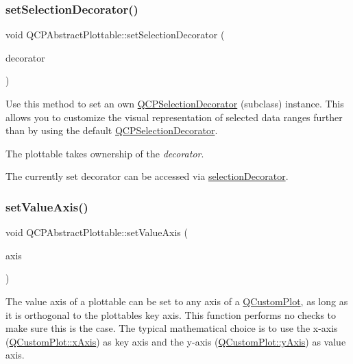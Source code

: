 \subsubsection{\texorpdfstring{set\+Selection\+Decorator()}{setSelectionDecorator()}}
{\footnotesize\ttfamily void Q\+C\+P\+Abstract\+Plottable\+::set\+Selection\+Decorator (\begin{DoxyParamCaption}\item[{\hyperlink{class_q_c_p_selection_decorator}{Q\+C\+P\+Selection\+Decorator} $\ast$}]{decorator }\end{DoxyParamCaption})}

Use this method to set an own \hyperlink{class_q_c_p_selection_decorator}{Q\+C\+P\+Selection\+Decorator} (subclass) instance. This allows you to customize the visual representation of selected data ranges further than by using the default \hyperlink{class_q_c_p_selection_decorator}{Q\+C\+P\+Selection\+Decorator}.

The plottable takes ownership of the {\itshape decorator}.

The currently set decorator can be accessed via \hyperlink{class_q_c_p_abstract_plottable_a7861518e47ca0c6a0c386032c2db075e}{selection\+Decorator}. \mbox{\label{class_q_c_p_abstract_plottable_a71626a07367e241ec62ad2c34baf21cb}} 
\subsubsection{\texorpdfstring{set\+Value\+Axis()}{setValueAxis()}}
{\footnotesize\ttfamily void Q\+C\+P\+Abstract\+Plottable\+::set\+Value\+Axis (\begin{DoxyParamCaption}\item[{\hyperlink{class_q_c_p_axis}{Q\+C\+P\+Axis} $\ast$}]{axis }\end{DoxyParamCaption})}

The value axis of a plottable can be set to any axis of a \hyperlink{class_q_custom_plot}{Q\+Custom\+Plot}, as long as it is orthogonal to the plottable\textquotesingle{}s key axis. This function performs no checks to make sure this is the case. The typical mathematical choice is to use the x-\/axis (\hyperlink{class_q_custom_plot_a9a79cd0158a4c7f30cbc702f0fd800e4}{Q\+Custom\+Plot\+::x\+Axis}) as key axis and the y-\/axis (\hyperlink{class_q_custom_plot_af6fea5679725b152c14facd920b19367}{Q\+Custom\+Plot\+::y\+Axis}) as value axis.

